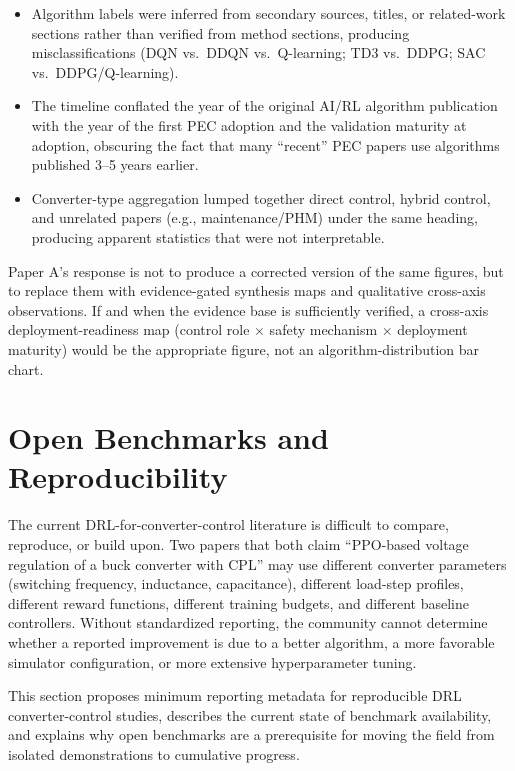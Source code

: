 \documentclass[manuscript,screen,review]{acmart}
\begin{document}
\begin{itemize}
  \item Algorithm labels were inferred from secondary sources, titles, or related-work sections rather than verified from method sections, producing misclassifications (DQN vs.\ DDQN vs.\ Q-learning; TD3 vs.\ DDPG; SAC vs.\ DDPG/Q-learning).
  \item The timeline conflated the year of the original AI/RL algorithm publication with the year of the first PEC adoption and the validation maturity at adoption, obscuring the fact that many ``recent'' PEC papers use algorithms published 3--5 years earlier.
  \item Converter-type aggregation lumped together direct control, hybrid control, and unrelated papers (e.g., maintenance/PHM) under the same heading, producing apparent statistics that were not interpretable.
\end{itemize}

Paper A's response is not to produce a corrected version of the same figures, but to replace them with evidence-gated synthesis maps and qualitative cross-axis observations.
If and when the evidence base is sufficiently verified, a cross-axis deployment-readiness map (control role $\times$ safety mechanism $\times$ deployment maturity) would be the appropriate figure, not an algorithm-distribution bar chart.

\section{Open Benchmarks and Reproducibility}
\label{sec:benchmarks}

The current DRL-for-converter-control literature is difficult to compare, reproduce, or build upon.
Two papers that both claim ``PPO-based voltage regulation of a buck converter with CPL'' may use different converter parameters (switching frequency, inductance, capacitance), different load-step profiles, different reward functions, different training budgets, and different baseline controllers.
Without standardized reporting, the community cannot determine whether a reported improvement is due to a better algorithm, a more favorable simulator configuration, or more extensive hyperparameter tuning.

This section proposes minimum reporting metadata for reproducible DRL converter-control studies, describes the current state of benchmark availability, and explains why open benchmarks are a prerequisite for moving the field from isolated demonstrations to cumulative progress.
\end{document}
